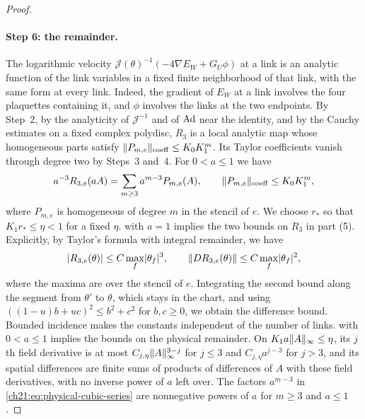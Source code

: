 \begin{proof}
\paragraph{Step 6: the remainder.}
The logarithmic velocity $\mathcal J(\theta)^{-1}(-4\nabla E_W+G_U\phi)$ at a link is an analytic function of the link variables in a fixed finite neighborhood of that link, with the same form at every link. Indeed, the gradient of $E_W$ at a link involves the four plaquettes containing it, and $\phi$ involves the links at the two endpoints. By Step~2, by the analyticity of $\mathcal J^{-1}$ and of $\operatorname{Ad}$ near the identity, and by the Cauchy estimates on a fixed complex polydisc, $R_3$ is a local analytic map whose homogeneous parts satisfy $\lVert P_{m,e}\rVert_{\mathrm{coeff}}\le K_0K_1^m$. Its Taylor coefficients vanish through degree two by Steps~3 and~4. For $0<a\le1$ we have
\begin{equation}\label{ch21:eq:physical-cubic-series}
 a^{-3}R_{3,e}(aA)=\sum_{m\ge3}a^{m-3}P_{m,e}(A),\qquad \lVert P_{m,e}\rVert_{\mathrm{coeff}}\le K_0K_1^m,
\end{equation}
where $P_{m,e}$ is homogeneous of degree $m$ in the stencil of $e$. We choose $r_*$ so that $K_1r_*\le\eta<1$ for a fixed $\eta$.  with $a=1$ implies the two bounds on $R_3$ in part (5). Explicitly, by Taylor's formula with integral remainder, we have
\[
 \lvert R_{3,e}(\theta)\rvert\le C\max_{f}\lvert \theta_f\rvert^3,\qquad
 \lVert DR_{3,e}(\theta)\rVert\le C\max_f\lvert \theta_f\rvert^2,
\]
where the maxima are over the stencil of $e$. Integrating the second bound along the segment from $\theta'$ to $\theta$, which stays in the chart, and using $((1-u)b+uc)^2\le b^2+c^2$ for $b,c\ge0$, we obtain the difference bound. Bounded incidence makes the constants independent of the number of links.  with $0<a\le1$ implies the bounds on the physical remainder. On $K_1a\lVert A\rVert_\infty\le\eta$, its $j$th field derivative is at most $C_{j,\eta}\lVert A\rVert_\infty^{3-j}$ for $j\le3$ and $C_{j,\eta}a^{j-3}$ for $j>3$, and its spatial differences are finite sums of products of differences of $A$ with these field derivatives, with no inverse power of $a$ left over. The factors $a^{m-3}$ in \eqref{ch21:eq:physical-cubic-series} are nonnegative powers of $a$ for $m\ge3$ and $a\le1$.


\end{proof}

